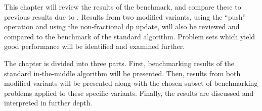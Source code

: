 This chapter will review the results of the benchmark, and compare these to previous results due to \textcite{deGivry14}.
Results from two modified variants, using the \enquote{push} operation and using the non-fractional \gls{dp} update, will also be reviewed and compared to the benchmark of the standard algorithm.
Problem sets which yield good performance will be identified and examined further.

The chapter is divided into three parts.
First, benchmarking results of the standard in-the-middle algorithm will be presented.
Then, results from both modified variants will be presented along with the chosen subset of benchmarking problems applied to these specific variants.
Finally, the results are discussed and interpreted in further depth.
